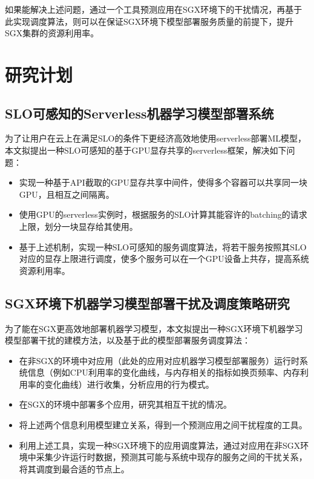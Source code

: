 如果能解决上述问题，通过一个工具预测应用在SGX环境下的干扰情况，再基于此实现调度算法，则可以在保证SGX环境下模型部署服务质量的前提下，提升SGX集群的资源利用率。


\section{研究计划}

\subsection{SLO可感知的Serverless机器学习模型部署系统}
为了让用户在云上在满足SLO的条件下更经济高效地使用serverless部署ML模型，本文拟提出一种SLO可感知的基于GPU显存共享的serverless框架，解决如下问题：
\begin{itemize}
    \item 实现一种基于API截取的GPU显存共享中间件，使得多个容器可以共享同一块GPU，且相互之间隔离。
    \item 使用GPU的serverless实例时，根据服务的SLO计算其能容许的batching的请求上限，划分一块显存给其使用。
    \item 基于上述机制，实现一种SLO可感知的服务调度算法，将若干服务按照其SLO对应的显存上限进行调度，使多个服务可以在一个GPU设备上共存，提高系统资源利用率。
\end{itemize}

\subsection{SGX环境下机器学习模型部署干扰及调度策略研究}
为了能在SGX更高效地部署机器学习模型，本文拟提出一种SGX环境下机器学习模型部署干扰的建模方法，以及基于此的模型部署服务调度算法：
\begin{itemize}
    \item 在非SGX的环境中对应用（此处的应用对应机器学习模型部署服务）运行时系统信息（例如CPU利用率的变化曲线，与内存相关的指标如换页频率、内存利用率的变化曲线）进行收集，分析应用的行为模式。
    \item 在SGX的环境中部署多个应用，研究其相互干扰的情况。
    \item 将上述两个信息利用模型建立关系，得到一个预测应用之间干扰程度的工具。
    \item 利用上述工具，实现一种SGX环境下的应用调度算法，通过对应用在非SGX环境中采集少许运行时数据，预测其可能与系统中现存的服务之间的干扰关系，将其调度到最合适的节点上。
\end{itemize}

